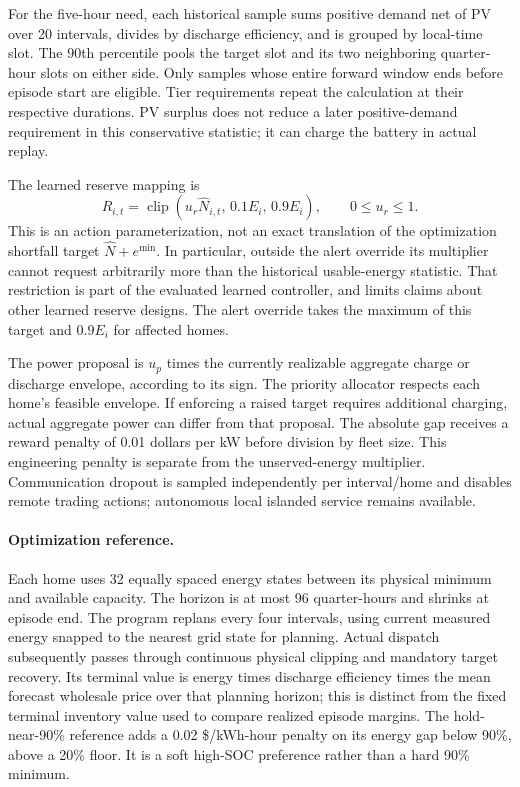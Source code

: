 For the five-hour need, each historical sample sums positive demand net of PV over 20 intervals, divides by discharge efficiency, and is grouped by local-time slot. The 90th percentile pools the target slot and its two neighboring quarter-hour slots on either side. Only samples whose entire forward window ends before episode start are eligible. Tier requirements repeat the calculation at their respective durations. PV surplus does not reduce a later positive-demand requirement in this conservative statistic; it can charge the battery in actual replay.

The learned reserve mapping is
\begin{equation}
R_{i,t}=\operatorname{clip}\left(u_r\hat N_{i,t},\,0.1E_i,\,0.9E_i\right),\qquad 0\le u_r\le1.
\end{equation}
This is an action parameterization, not an exact translation of the optimization shortfall target $\hat N+e^{\min}$. In particular, outside the alert override its multiplier cannot request arbitrarily more than the historical usable-energy statistic. That restriction is part of the evaluated learned controller, and limits claims about other learned reserve designs. The alert override takes the maximum of this target and $0.9E_i$ for affected homes.

The power proposal is $u_p$ times the currently realizable aggregate charge or discharge envelope, according to its sign. The priority allocator respects each home's feasible envelope. If enforcing a raised target requires additional charging, actual aggregate power can differ from that proposal. The absolute gap receives a reward penalty of 0.01 dollars per kW before division by fleet size. This engineering penalty is separate from the unserved-energy multiplier. Communication dropout is sampled independently per interval/home and disables remote trading actions; autonomous local islanded service remains available.

\paragraph{Optimization reference.}
Each home uses 32 equally spaced energy states between its physical minimum and available capacity. The horizon is at most 96 quarter-hours and shrinks at episode end. The program replans every four intervals, using current measured energy snapped to the nearest grid state for planning. Actual dispatch subsequently passes through continuous physical clipping and mandatory target recovery. Its terminal value is energy times discharge efficiency times the mean forecast wholesale price over that planning horizon; this is distinct from the fixed terminal inventory value used to compare realized episode margins. The hold-near-90\% reference adds a 0.02 \$/kWh-hour penalty on its energy gap below 90\%, above a 20\% floor. It is a soft high-SOC preference rather than a hard 90\% minimum.

